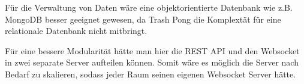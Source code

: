 \documentclass[
]{article}
\begin{document}
Für die Verwaltung von Daten wäre eine objektorientierte Datenbank wie z.B. MongoDB besser geeignet gewesen, da 
Trash Pong die Komplextät für eine relationale Datenbank nicht mitbringt. 

Für eine bessere Modularität hätte man hier die REST API und den Websocket in zwei separate Server aufteilen können.
Somit wäre es möglich die Server nach Bedarf zu skalieren, sodass jeder Raum seinen eigenen Websocket Server hätte.

\newpage
 \printbibliography[title={Quellen}]
\end{document}
